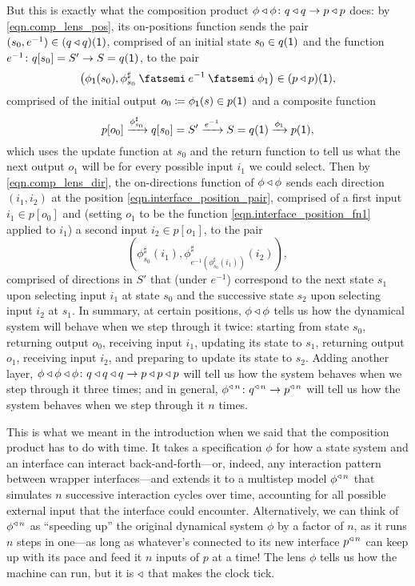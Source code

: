 \documentclass[Book-Poly]{subfiles}
\begin{document}
But this is exactly what the composition product $\phi\mathbin{\triangleleft}\phi\colon q\mathbin{\triangleleft} q\to p\mathbin{\triangleleft} p$ does: by \eqref{eqn.comp_lens_pos}, its on-positions function sends the pair $(s_0,e^{-1})\in(q\mathbin{\triangleleft} q)(\textsf{1})$, comprised of an initial state $s_0\in q(\textsf{1})$ and the function $e^{-1}\colon q[s_0]=S'\to S=q(\textsf{1})$, to the pair
\begin{equation} \label{eqn.interface_position_pair}
    \left(\phi_\1(s_0),\phi^\sharp_{s_0}\then e^{-1}\then\phi_\1\right)\in(p\tri p)(\1),
\end{equation}
comprised of the initial output $o_0\coloneqq\phi_{\textsf{1}}(s)\in p(\textsf{1})$ and a composite function
\begin{equation} \label{eqn.interface_position_fn1}
    p[o_0]\xrightarrow{\phi^\sharp_{s_0}}q[s_0]=S'\xrightarrow{e^{-1}}S=q(\textsf{1})\xrightarrow{\phi_{\textsf{1}}}p(\textsf{1}),
\end{equation}
which uses the update function at $s_0$ and the return function to tell us what the next output $o_1$ will be for every possible input $i_1$ we could select.
Then by \eqref{eqn.comp_lens_dir}, the on-directions function of $\phi\mathbin{\triangleleft}\phi$ sends each direction $(i_1,i_2)$ at the position \eqref{eqn.interface_position_pair}, comprised of a first input $i_1\in p[o_0]$ and (setting $o_1$ to be the function \eqref{eqn.interface_position_fn1} applied to $i_1$) a second input $i_2\in p[o_1]$, to the pair
\[
    \left(\phi^\sharp_{s_0}(i_1), \phi^\sharp_{e^{-1}(\phi^\sharp_{s_0}(i_1))}(i_2)\right),
\]
comprised of directions in $S'$ that (under $e^{-1}$) correspond to the next state $s_1$ upon selecting input $i_1$ at state $s_0$ and the successive state $s_2$ upon selecting input $i_2$ at $s_1$.
In summary, at certain positions, $\phi\mathbin{\triangleleft}\phi$ tells us how the dynamical system will behave when we step through it twice: starting from state $s_0$, returning output $o_0$, receiving input $i_1$, updating its state to $s_1$, returning output $o_1$, receiving input $i_2$, and preparing to update its state to $s_2$.
Adding another layer, $\phi\mathbin{\triangleleft}\phi\mathbin{\triangleleft}\phi\colon q\mathbin{\triangleleft} q\mathbin{\triangleleft} q\to p\mathbin{\triangleleft} p\mathbin{\triangleleft} p$ will tell us how the system behaves when we step through it three times; and in general, $\phi^{\mathbin{\triangleleft}\,n}\colon q^{\mathbin{\triangleleft}\,n}\to p^{\mathbin{\triangleleft}\,n}$ will tell us how the system behaves when we step through it $n$ times.

This is what we meant in the introduction when we said that the composition product has to do with time.
It takes a specification $\phi$ for how a state system and an interface can interact back-and-forth---or, indeed, any interaction pattern between wrapper interfaces---and extends it to a multistep model $\phi^{\mathbin{\triangleleft}\,n}$ that simulates $n$ successive interaction cycles over time, accounting for all possible external input that the interface could encounter.
Alternatively, we can think of $\phi^{\mathbin{\triangleleft}\,n}$ as ``speeding up'' the original dynamical system $\phi$ by a factor of $n$, as it runs $n$ steps in one---as long as whatever's connected to its new interface $p^{\mathbin{\triangleleft}\,n}$ can keep up with its pace and feed it $n$ inputs of $p$ at a time!
The lens $\phi$ tells us how the machine can run, but it is $\mathbin{\triangleleft}$ that makes the clock tick.
\end{document}
